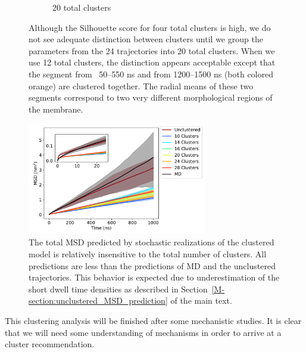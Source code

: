 \documentclass{article}
\begin{document}
\begin{figure}
\begin{subfigure}{0.9\textwidth}
  \caption{20 total clusters}\label{fig:20cluster_state_sequence}
  \end{subfigure}
  \caption{Although the Silhouette score for four total clusters is high, we do
  not see adequate distinction between clusters until we group the parameters
  from the 24 trajectories into 20 total clusters. When we use 12 total clusters,
  the distinction appears acceptable except that the segment from ~50--550 ns
  and from 1200--1500 ns (both colored orange) are clustered together. The radial
  means of these two segments correspond to two very different morphological
  regions of the membrane.}\label{fig:clustered_state_sequences}
  \end{figure}
  
  \begin{figure}
  \centering
  \includegraphics[width=0.7\textwidth]{nclusters_msd_MET_ward.pdf}
  \caption{The total MSD predicted by stochastic realizations of the clustered
  model is relatively insensitive to the total number of clusters. All
  predictions are less than the predictions of MD and the unclustered trajectories.
  This behavior is expected due to underestimation of the short dwell time 
  densities as described in Section~\ref{M-section:unclustered_MSD_prediction}
  of the main text.}\label{fig:MET_nclusters} 
  \end{figure}
  
  This clustering analysis will be finished after some mechanistic studies. It is
  clear that we will need some understanding of mechanisms in order to 
  arrive at a cluster recommendation.
  
\end{document}
